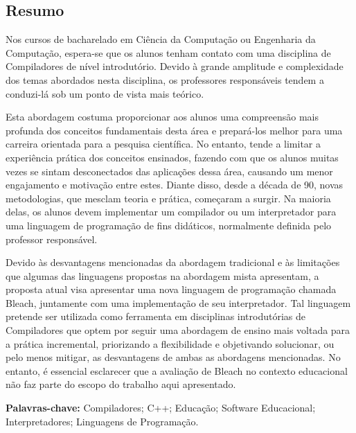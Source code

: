 \thispagestyle{empty}
\begin{spacing}{1.0}
\chapter*{Resumo}
Nos cursos de bacharelado em Ciência da Computação ou Engenharia da Computação, espera-se que os alunos tenham contato com uma disciplina de Compiladores de nível introdutório. Devido à grande amplitude e complexidade dos temas abordados nesta disciplina, os professores responsáveis tendem a conduzi-lá sob um ponto de vista mais teórico. 

Esta abordagem costuma proporcionar aos alunos uma compreensão mais profunda dos conceitos fundamentais desta área e prepará-los melhor para uma carreira orientada para a pesquisa científica. No entanto, tende a limitar a experiência prática dos conceitos ensinados, fazendo com que os alunos muitas vezes se sintam desconectados das aplicações dessa área, causando um menor engajamento e motivação entre estes. Diante disso, desde a década de 90, novas metodologias, que mesclam teoria e prática, começaram a surgir. Na maioria delas, os alunos devem implementar um compilador ou um interpretador para uma linguagem de programação de fins didáticos, normalmente definida pelo professor responsável.

Devido às desvantagens mencionadas da abordagem tradicional e às limitações que algumas das linguagens propostas na abordagem mista apresentam, a proposta atual visa apresentar uma nova linguagem de programação chamada Bleach, juntamente com uma implementação de seu interpretador. Tal linguagem pretende ser utilizada como ferramenta em disciplinas introdutórias de Compiladores que optem por seguir uma abordagem de ensino mais voltada para a prática incremental, priorizando a flexibilidade e objetivando solucionar, ou pelo menos mitigar, as desvantagens de ambas as abordagens mencionadas. No entanto, é essencial esclarecer que a avaliação de Bleach no contexto educacional não faz parte do escopo do trabalho aqui apresentado.

\textbf{Palavras-chave:} Compiladores; C++; Educação; Software Educacional; Interpretadores; Linguagens de Programação.
        
\clearpage
\end{spacing}